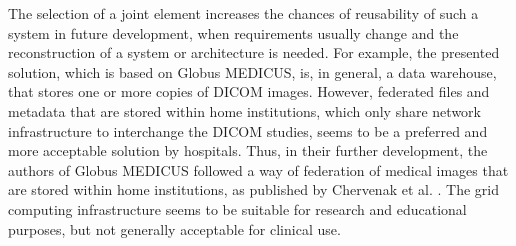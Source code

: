 The selection of a joint element increases the chances of reusability of such a system in future development, when requirements usually change and the reconstruction of a system or architecture is needed. For example, the presented solution, which is based on Globus MEDICUS, is, in general, a data warehouse, that stores one or more copies of DICOM images. However, federated files and metadata that are stored within home institutions, which only share network infrastructure to interchange the DICOM studies, seems to be a preferred and more acceptable solution by hospitals. Thus, in their further development, the authors of Globus MEDICUS followed a way of federation of medical images that are stored within home institutions, as published by Chervenak et al. \cite{Chervenak2012}. The grid computing infrastructure seems to be suitable for research and educational purposes, but not generally acceptable for clinical use. %

%



 
